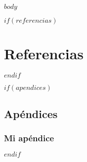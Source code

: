 \documentclass[es]{uc3mreport}
\author{
    $for(autores)$
      ${autores.nombre} -- ${autores.nia}
      $sep$\\
    $endfor$
}
\title{${titulo}}
\begin{document}
    \makecover

    \tableofcontents

    \begin{report}

      $body$

    \end{report}

    $if(referencias)$
      \label{bibliography}
      \part{Referencias}
      \printbibliography
    $endif$

    $if(apendices)$
      \begin{appendices}
          \part{Apéndices}  %
          \section{Mi apéndice}
          \lipsum[1]
      \end{appendices}
    $endif$
\end{document}
